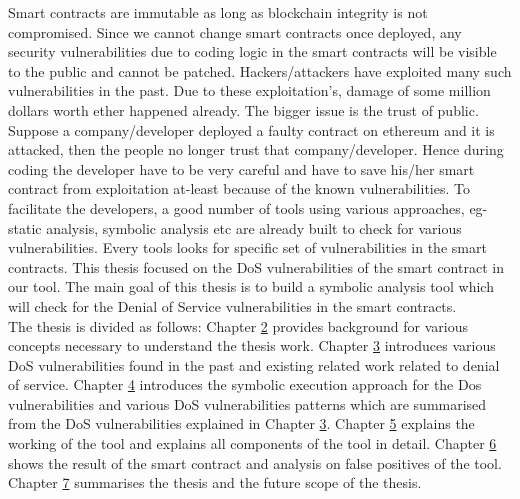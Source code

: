 Smart contracts are immutable as long as blockchain integrity is not compromised. Since we cannot change smart contracts once deployed, any security vulnerabilities due to coding logic in the smart contracts will be visible to the public and cannot be patched. Hackers/attackers have exploited many such vulnerabilities in the past. Due to these exploitation's, damage of some million dollars worth ether happened already. The bigger issue is the trust of public. Suppose a company/developer deployed a faulty contract on ethereum and it is attacked, then the people no longer trust that company/developer. Hence during coding the developer have to be very careful and have to save his/her smart contract from exploitation at-least because of the known vulnerabilities. To facilitate the developers, a good number of tools using various approaches, eg-static analysis, symbolic analysis etc are already built to check for various vulnerabilities. Every tools looks for specific set of vulnerabilities in the smart contracts. This thesis focused on the DoS vulnerabilities of the smart contract in our tool. The main goal of this thesis is to build a symbolic analysis tool which will check for the Denial of Service vulnerabilities in the smart contracts.\\
The thesis is divided as follows: Chapter \href{ch:bcg}{2} provides background for various concepts necessary to understand the thesis work. Chapter \href{ch:DosVul}{3} introduces various DoS vulnerabilities found in the past and existing related work related to denial of service. Chapter \href{ch:symA}{4} introduces the symbolic execution approach for the Dos vulnerabilities and various DoS vulnerabilities patterns which are summarised from the DoS vulnerabilities explained in Chapter \href{ch:DosVul}{3}. Chapter \href{ch:work}{5} explains the working of the tool and explains all components of the tool in detail. Chapter \href{ch:result}{6} shows the result of the smart contract and analysis on false positives of the tool. Chapter \href{ch:conclusion}{7} summarises the thesis and the future scope of the thesis.